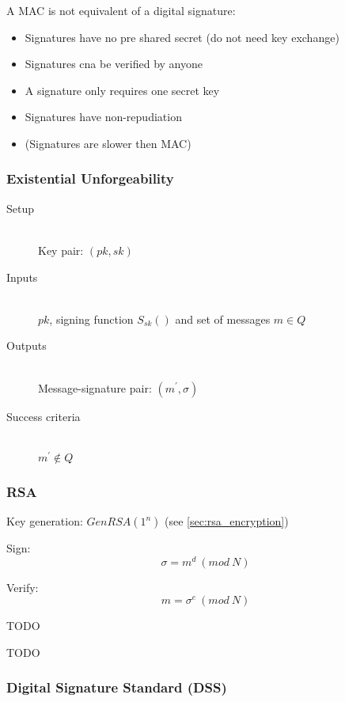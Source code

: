 \documentclass[a4paper]{article}
\begin{document}
A MAC is not equivalent of a digital signature:
\begin{itemize}
  \item Signatures have no pre shared secret (do not need key exchange)
  \item Signatures cna be verified by anyone
  \item A signature only requires one secret key
  \item Signatures have non-repudiation
  \item (Signatures are slower then MAC)
\end{itemize}

\subsubsection{Existential Unforgeability}

\begin{description}
  \item[Setup] \hfill \\
    Key pair: $(pk, sk)$
  \item[Inputs] \hfill \\
    $pk$, signing function $S_{sk}()$ and set of messages $m \in Q$
  \item[Outputs] \hfill \\
    Message-signature pair: $(m^{\prime}, \sigma)$
  \item[Success criteria] \hfill \\
    $m^{\prime} \not\in Q$
\end{description}

\subsubsection{RSA}

Key generation: $GenRSA(1^{n})$ (see \ref{sec:rsa_encryption})

Sign:
\[
  \sigma = m^{d} \: (mod \: N)
\]

Verify:
\[
  m = \sigma^{e} \: (mod \: N)
\]


TODO


TODO

\subsubsection{Digital Signature Standard (DSS)}
\end{document}
